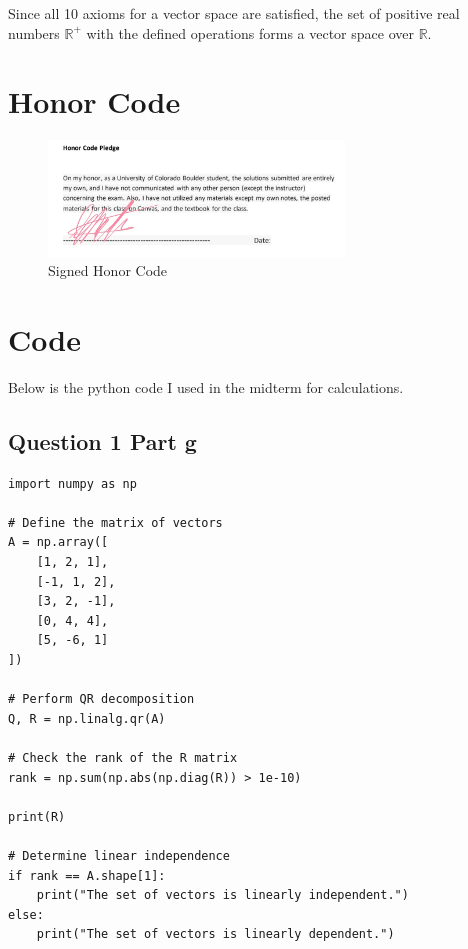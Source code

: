 \documentclass{article}
\begin{document}
Since all 10 axioms for a vector space are satisfied, the set of positive real numbers \( \mathbb{R}^+ \) with the defined operations forms a vector space over \( \mathbb{R} \).

\section*{Honor Code}

\begin{figure}[h!]
    \centering
    \includegraphics[width=0.7\textwidth]{midtermHonorCode.jpg}
    \caption{Signed Honor Code}
    \label{fig:midtermHonorCode}
\end{figure}

\section*{Code}

Below is the python code I used in the midterm for calculations.

\subsection*{Question 1 Part g}
\begin{lstlisting}[style=pythonstyle]
import numpy as np

# Define the matrix of vectors
A = np.array([
    [1, 2, 1],
    [-1, 1, 2],
    [3, 2, -1],
    [0, 4, 4],
    [5, -6, 1]
])

# Perform QR decomposition
Q, R = np.linalg.qr(A)

# Check the rank of the R matrix
rank = np.sum(np.abs(np.diag(R)) > 1e-10)

print(R)

# Determine linear independence
if rank == A.shape[1]:
    print("The set of vectors is linearly independent.")
else:
    print("The set of vectors is linearly dependent.")
\end{lstlisting}
    
\end{document}
